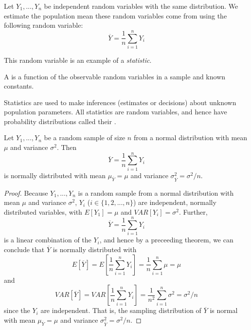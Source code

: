 \documentclass[12pt, a4paper, twoside, openright, titlepage]{book}
\begin{document}
\begin{defn}{}{}
    Let $Y_1,...,Y_n$ be independent random variables with the same distribution. We estimate the population mean these random variables come from using the following random variable: \begin{equation*}
        \overline{Y} = \frac{1}{n}\sum\limits_{i=1}^nY_i
    \end{equation*}
\end{defn}

This random variable is an example of a \emph{statistic}.

\begin{defn}{}{}
    A  is a function of the observable random variables in a sample and known constants.
\end{defn}

Statistics are used to make inferences (estimates or decisions) about unknown population parameters. All statistics are random variables, and hence have probability distributions called their . 

\begin{thm}{}{}
    Let $Y_1,...,Y_n$ be a random sample of size $n$ from a normal distribution with mean $\mu$ and variance $\sigma^2$. Then \begin{equation*}
        \overline{Y} = \frac{1}{n}\sum\limits_{i=1}^nY_i
    \end{equation*}
    is normally distributed with mean $\mu_{\overline{Y}} = \mu$ and variance $\sigma^2_{\overline{Y}} = \sigma^2/n$.
\end{thm}
\begin{proof}{}{}
    Because $Y_1,...,Y_n$ is a random sample from a normal distribution with mean $\mu$ and variance $\sigma^2$, $Y_i$ ($i \in \{1,2,...,n\}$) are independent, normally distributed variables, with $E[Y_1] = \mu$ and $VAR[Y_i] = \sigma^2$. Further, \begin{equation*}
        \overline{Y} = \frac{1}{n}\sum\limits_{i=1}^nY_i
    \end{equation*}
    is a linear combination of the $Y_i$, and hence by a preceeding theorem, we can conclude that $\overline{Y}$ is normally distributed with \begin{equation*}
        E[\overline{Y}] = E\left[\frac{1}{n}\sum\limits_{i=1}^nY_i\right] = \frac{1}{n}\sum\limits_{i=1}^n\mu = \mu
    \end{equation*}
    and \begin{equation*}
        VAR[\overline{Y}] = VAR\left[\frac{1}{n}\sum\limits_{i=1}^nY_i\right] = \frac{1}{n^2}\sum\limits_{i=1}^n\sigma^2 = \sigma^2/n
    \end{equation*}
    since the $Y_i$ are independent. That is, the sampling distribution of $\overline{Y}$ is normal with mean $\mu_{\overline{Y}} = \mu$ and variance $\sigma^2_{\overline{Y}} = \sigma^2/n$.
\end{proof}
\end{document}
